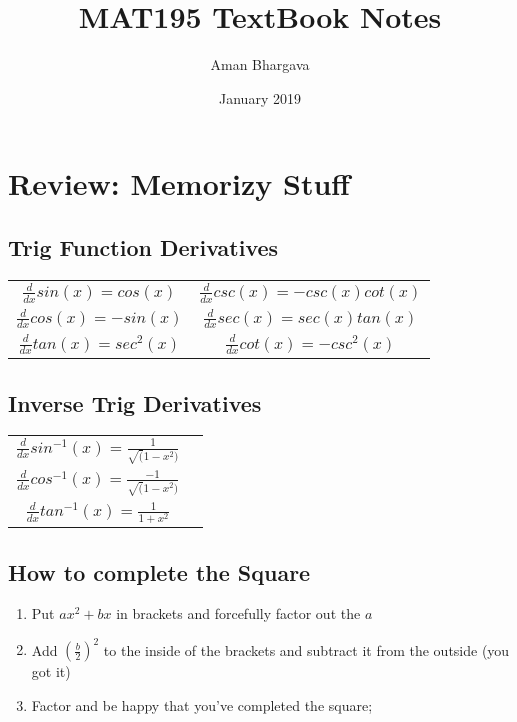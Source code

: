 \documentclass[a4paper,12pt]{report}
\begin{document}
\title{MAT195 TextBook Notes}
\author{Aman Bhargava}
\date{January 2019}
\maketitle

\tableofcontents


\pagebreak
\section{Review: Memorizy Stuff}
\subsection{Trig Function Derivatives}
\def\arraystretch{2}%
\begin{tabular}{cc}
$ \frac{d}{dx}sin(x) = cos(x) $ & $ \frac{d}{dx}csc(x) = -csc(x)cot(x) $ \\
$ \frac{d}{dx}cos(x) = -sin(x) $ & $ \frac{d}{dx}sec(x) = sec(x)tan(x) $ \\
$ \frac{d}{dx}tan(x) = sec^2(x) $ & $ \frac{d}{dx}cot(x) = -csc^2(x) $ \\
\end{tabular}

\subsection{Inverse Trig Derivatives}
\def\arraystretch{2}%
\begin{tabular}{cc}
$ \frac{d}{dx}sin^{-1}(x) = \frac{1}{\sqrt(1-x^2)} $ \\
$ \frac{d}{dx}cos^{-1}(x) = \frac{-1}{\sqrt(1-x^2)} $ \\
$ \frac{d}{dx}tan^{-1}(x) = \frac{1}{1+x^2} $ \\
\end{tabular}

\subsection{How to complete the Square}
\begin{enumerate}
\item Put $ax^2 + bx$ in brackets and forcefully factor out the $a$
\item Add $ ( \frac{b}{2})^2$ to the inside of the brackets and subtract it from the outside (you got it)
\item Factor and be happy that you've completed the square;
\end{enumerate}
\end{document}
